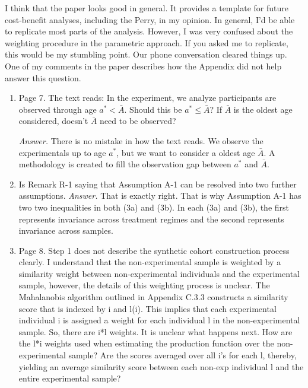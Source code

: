 I think that the paper looks good in general. It provides a template for future cost-benefit analyses, including the Perry, in my opinion. In general, I'd be able to replicate most parts of the analysis. However, I was very confused about the weighting procedure in the parametric approach. If you asked me to replicate, this would be my stumbling point. Our phone conversation cleared things up. One of my comments in the paper describes how the Appendix did not help answer this question. 

\begin{enumerate}

\item Page 7. The text reads: In the experiment, we analyze participants are observed through age $a^* < \bar{A}$. Should this be $a^* \leq \bar{A}$? If $\bar{A}$ is the oldest age considered, doesn't $\bar{A}$ need to be observed?

\noindent \textit{Answer.} There is no mistake in how the text reads. We observe the experimentals up to age $a^*$, but we want to consider a oldest age $\bar{A}$. A methodology is created to fill the observation gap between $a^*$ and $\bar{A}$.

\item Is Remark R-1 saying that Assumption A-1 can be resolved into two further assumptions.
\noindent \textit{Answer.} That is exactly right. That is why Assumption A-1 has two two inequalities in both (3a) and (3b). In each (3a) and (3b), the first represents invariance across treatment regimes and the second represents invariance across samples.

\item Page 8. Step 1 does not describe the synthetic cohort construction process clearly. I understand that the non-experimental sample is weighted by a similarity weight between non-experimental individuals and the experimental sample, however, the details of this weighting process is unclear. The Mahalanobis algorithm outlined in Appendix C.3.3 constructs a similarity score that is indexed by i and l(i). This implies that each experimental individual i is assigned a weight for each individual l in the non-experimental sample. So, there are i*l weights. It is unclear what happens next. How are the l*i weights used when estimating the production function over the non-experimental sample? Are the scores averaged over all i's for each l, thereby, yielding an average similarity score between each non-exp individual l and the entire experimental sample?


\end{enumerate}

